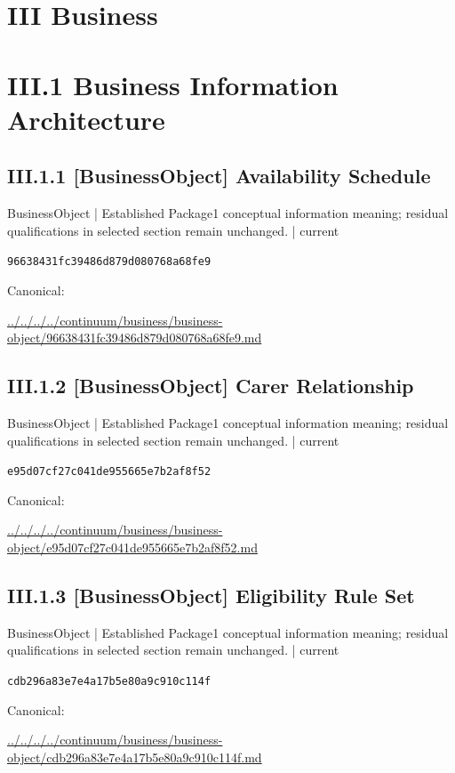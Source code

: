 \documentclass[10pt,a4paper]{article}
\begin{document}
\section*{III Business}
\section*{III.1 Business Information Architecture}
\subsection*{III.1.1 [BusinessObject] Availability Schedule}
{\small BusinessObject | Established Package1 conceptual information meaning; residual qualifications in selected section remain unchanged. | current}\par
\texttt{96638431fc39486d879d080768a68fe9}\par
Canonical: \par
{\footnotesize\url{../../../../continuum/business/business-object/96638431fc39486d879d080768a68fe9.md}}\par
\subsection*{III.1.2 [BusinessObject] Carer Relationship}
{\small BusinessObject | Established Package1 conceptual information meaning; residual qualifications in selected section remain unchanged. | current}\par
\texttt{e95d07cf27c041de955665e7b2af8f52}\par
Canonical: \par
{\footnotesize\url{../../../../continuum/business/business-object/e95d07cf27c041de955665e7b2af8f52.md}}\par
\subsection*{III.1.3 [BusinessObject] Eligibility Rule Set}
{\small BusinessObject | Established Package1 conceptual information meaning; residual qualifications in selected section remain unchanged. | current}\par
\texttt{cdb296a83e7e4a17b5e80a9c910c114f}\par
Canonical: \par
{\footnotesize\url{../../../../continuum/business/business-object/cdb296a83e7e4a17b5e80a9c910c114f.md}}\par
\end{document}
